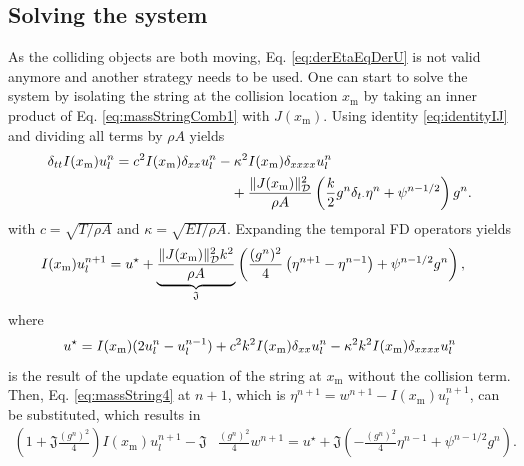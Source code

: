 \subsection{Solving the system}
As the colliding objects are both moving, Eq. \eqref{eq:derEtaEqDerU} is not valid anymore and another strategy needs to be used.
One can start to solve the system by isolating the string at the collision location $x_\text{m}$ by taking an inner product of Eq. \eqref{eq:massStringComb1} with $J(x_\text{m})$. Using identity \eqref{eq:identityIJ} and dividing all terms by $\rho A$ yields
\begin{align*}
    \delta_{tt}I(x_\text{m})u^n_l =c^2I(x_\text{m})\delta_{xx}u^n_l &- \kappa^2I(x_\text{m})\delta_{xxxx}u_l^n \\
    &\quad + \frac{\lVert J(x_\text{m})\rVert^2_{\mathcal{D}}}{\rho A} \left(\frac{k}{2}g^n\delta_{t\cdot}\eta^n + \psi^{n-1/2}\right)g^n.
\end{align*}
with $c = \sqrt{T/\rho A}$ and $\kappa = \sqrt{EI/\rho A}$. Expanding the temporal FD operators yields 
\begin{align*}
    I(x_\text{m})u_l^{n+1} &= u^\star+ \underbrace{\frac{\lVert J(x_\text{m})\rVert^2_{\mathcal{D}} k^2}{\rho A}}_{\mathfrak{J}} \left(\frac{(g^n)^2}{4}\left(\eta^{n+1}-\eta^{n-1}\right) + \psi^{n-1/2}g^n\right),
\end{align*}
where 
\begin{equation*}
    u^\star = I(x_\text{m})(2u_l^n -u_l^{n-1}) + c^2k^2I(x_\text{m})\delta_{xx}u_l^n- \kappa^2k^2I(x_\text{m})\delta_{xxxx}u_l^n
\end{equation*}
is the result of the update equation of the string at $x_\text{m}$ without the collision term. Then, Eq. \eqref{eq:massString4} at $n+1$, which is $\eta^{n+1} = w^{n+1} - I(x_\text{m})u_l^{n+1}$, can be substituted, which results in
\begin{equation}\label{eq:expandedMassString1}
    \begin{aligned}
    \left(1 + \mathfrak{J}\frac{(g^n)^2}{4}\right)I(x_\text{m})u_l^{n+1} - \mathfrak{J}&\frac{(g^n)^2}{4} w^{n+1}= u^\star + \mathfrak{J} \left(-\frac{(g^n)^2}{4}\eta^{n-1} + \psi^{n-1/2}g^n\right).
    \end{aligned}
\end{equation}
    
